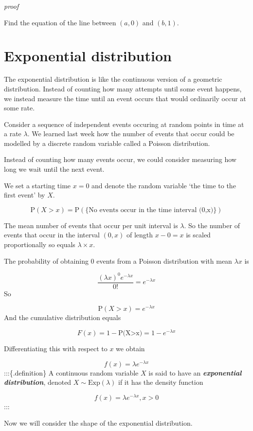 \documentclass[
]{book}
\theoremstyle{definition}
\theoremstyle{definition}
\theoremstyle{definition}
\theoremstyle{definition}
\theoremstyle{remark}
\begin{document}
\emph{proof}

Find the equation of the line between \((a,0)\) and \((b,1)\).

\hypertarget{exponential-distribution}{%
\section{Exponential distribution}\label{exponential-distribution}}

The exponential distribution is like the continuous version of a geometric distribution. Instead of counting how many attempts until some event happens, we instead measure the time until an event occurs that would ordinarily occur at some rate.

Consider a sequence of independent events occuring at random points in time at a rate \(\lambda\). We learned last week how the number of events that occur could be modelled by a discrete random variable called a Poisson distribution.

Instead of counting how many events occur, we could consider measuring how long we wait until the next event.

We set a starting time \(x=0\) and denote the random variable `the time to the first event' by \(X\).

\[\text{P}(X>x) = \text{P}( \{\text{No events occur in the time interval (0,x)}\})\]

The mean number of events that occur per unit interval is \(\lambda\). So the number of events that occur in the interval \((0,x)\) of length \(x-0 = x\) is scaled proportionally so equals \(\lambda \times x\).

The probability of obtaining \(0\) events from a Poisson distribution with mean \(\lambda x\) is

\[\frac{(\lambda x)^0 e^{-\lambda x}}{0!} = e^{-\lambda x}\]
So

\[\text{P}(X>x) =  e^{-\lambda x}\]
And the cumulative distribution equals

\[F(x) = 1-\text{P(X>x)}=1-e^{-\lambda x}\]

Differentiating this with respect to \(x\) we obtain

\[f(x) = \lambda e^{-\lambda x}\]
:::\{.definition\}
A continuous random variable \(X\) is said to have an \textbf{\emph{exponential distribution}}, denoted \(X\sim \text{Exp}(\lambda)\) if it has the density function

\[f(x) = \lambda e^{-\lambda x} , x >0\]
:::

Now we will consider the shape of the exponential distribution.
\end{document}
